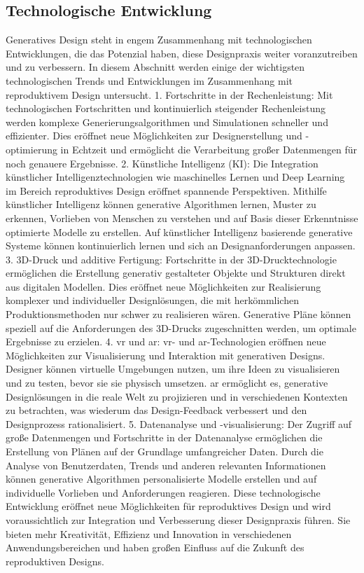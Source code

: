  \subsection*{Technologische Entwicklung}
 Generatives Design steht in engem Zusammenhang mit technologischen Entwicklungen, die das Potenzial haben, diese Designpraxis weiter voranzutreiben und zu verbessern. In diesem Abschnitt werden einige der wichtigsten technologischen Trends und Entwicklungen im Zusammenhang mit reproduktivem Design untersucht. 
 1. Fortschritte in der Rechenleistung: Mit  technologischen Fortschritten und kontinuierlich steigender Rechenleistung werden komplexe Generierungsalgorithmen und Simulationen schneller und effizienter. Dies eröffnet neue Möglichkeiten zur Designerstellung und -optimierung in Echtzeit und ermöglicht die Verarbeitung großer Datenmengen für noch genauere Ergebnisse.  2. Künstliche Intelligenz (KI): Die Integration künstlicher Intelligenztechnologien wie maschinelles Lernen und Deep Learning im Bereich reproduktives Design eröffnet spannende Perspektiven. Mithilfe künstlicher Intelligenz können generative Algorithmen lernen, Muster zu erkennen, Vorlieben von Menschen zu verstehen und auf Basis dieser Erkenntnisse optimierte Modelle zu erstellen. Auf künstlicher Intelligenz basierende generative Systeme können kontinuierlich lernen und sich an Designanforderungen anpassen. 
 3. 3D-Druck und additive Fertigung: Fortschritte in der 3D-Drucktechnologie ermöglichen die Erstellung generativ gestalteter Objekte und Strukturen direkt aus digitalen Modellen. Dies eröffnet neue Möglichkeiten zur Realisierung komplexer und individueller Designlösungen, die mit herkömmlichen Produktionsmethoden nur schwer zu realisieren wären. Generative Pläne können speziell auf die Anforderungen des 3D-Drucks zugeschnitten werden, um optimale Ergebnisse zu erzielen.  
 4. \ac*{vr} und \ac*{ar}: \ac*{vr}- und \ac*{ar}-Technologien eröffnen neue Möglichkeiten zur Visualisierung und Interaktion mit generativen Designs. Designer können virtuelle Umgebungen nutzen, um ihre Ideen zu visualisieren und zu testen,  bevor sie sie physisch umsetzen. \ac*{ar} ermöglicht es, generative Designlösungen in die reale Welt zu projizieren und  in verschiedenen Kontexten zu betrachten, was wiederum das Design-Feedback verbessert und den Designprozess rationalisiert. 
 5. Datenanalyse und -visualisierung: Der Zugriff auf große Datenmengen und  Fortschritte in der Datenanalyse ermöglichen die Erstellung von Plänen auf der Grundlage umfangreicher Daten. Durch die Analyse von Benutzerdaten, Trends und anderen relevanten Informationen können generative Algorithmen personalisierte Modelle erstellen und auf individuelle Vorlieben und Anforderungen reagieren.  Diese technologische Entwicklung eröffnet neue Möglichkeiten für reproduktives Design und wird voraussichtlich zur Integration und Verbesserung dieser Designpraxis führen. Sie bieten mehr Kreativität, Effizienz und Innovation in verschiedenen Anwendungsbereichen und haben großen Einfluss auf die Zukunft des reproduktiven Designs.

